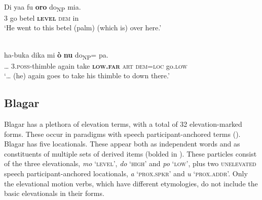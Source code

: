 \ea%
\label{ex:7:11}
 \\
\gll Di  yaa  {\ob}fu \textbf{oro} do{\cb}\textsubscript{NP} mia. \\
  \textsc{3} go   betel  \textbf{\textsc{level}} \textsc{dem} in  \\
\glt   `He went to this betel (palm) (which is) over here.'  
\z

  

 



 

\ea%
\label{ex:7:12}
 \\
\gll {\dots} ha-buka{\ng} dika{\ng} mi     {\ob}\textbf{ò} \textbf{nu}    do{\cb}\textsubscript{NP}={\ng}    pa. \\
  {\dots} 3.\textsc{poss}{}-thimble  again  take  \textbf{\textsc{low.far}} \textsc{art}  \textsc{dem=loc} go.\textsc{low}  \\
\glt `{\dots} (he) again goes to take his thimble to down there.' 
\z

 

   

  

\subsection{Blagar}
Blagar has a plethora of elevation terms, with a total of 32 elevation-marked forms. These occur in paradigms with speech participant-anchored terms (). Blagar has five locationals. These appear both as independent words and as constituents of multiple sets of derived items (bolded in ). These particles consist of the three elevationals, \textit{mo} `\textsc{level',} \textit{do} `\textsc{high'} and \textit{po} `\textsc{low',} plus two \textsc{unelevated} speech participant-anchored locationals, \textit{{\textglotstop}}\textit{a} `\textsc{prox.spkr'} and \textit{{\textglotstop}}\textit{u} `\textsc{prox.addr'.} Only the elevational motion verbs, which have different etymologies, do not include the basic elevationals  in their forms.



